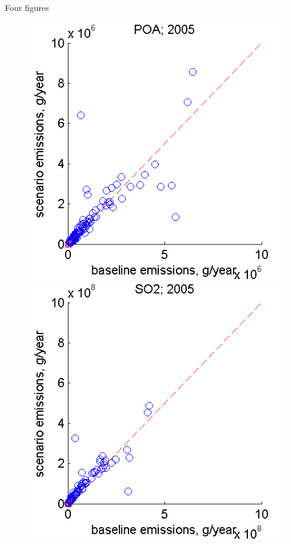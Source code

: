 \documentclass{beamer}	%
\begin{document}
\begin{frame}{Four figures}
\begin{figure}[ht]
	\begin{minipage}[b]{0.3\linewidth} 
		\centering
		\includegraphics[width=\textwidth]{images/filename1}
	\end{minipage}
	\hspace{1cm}
	\begin{minipage}[b]{0.3\linewidth}
		\centering
		\includegraphics[width=\textwidth]{images/filename2}
	\end{minipage}
\end{figure}

\end{frame}
\end{document}
